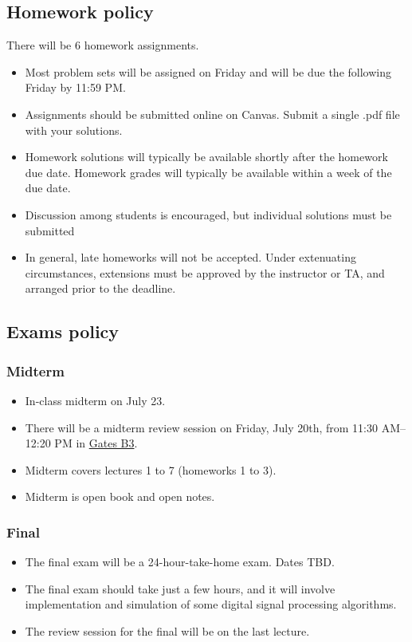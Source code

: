 \documentclass[10pt]{article}
\begin{document}
\subsection*{Homework policy}

There will be 6 homework assignments.
\begin{itemize}
	\item Most problem sets will be assigned on Friday and will be due the following Friday by 11:59 PM.
	\item Assignments should be submitted online on Canvas. Submit a single .pdf file with your solutions. 
	\item Homework solutions will typically be available shortly after the homework due date. Homework grades will typically be available within a week of the due date.
	\item Discussion among students is encouraged, but individual solutions must be submitted
	\item In general, late homeworks will not be accepted. Under extenuating circumstances, extensions must be approved by the instructor or TA, and arranged prior to the deadline.
\end{itemize}

\subsection*{Exams policy}
\subsubsection*{Midterm}
\begin{itemize}
	\item In-class midterm on July 23. 
	\item There will be a midterm review session on Friday, July 20th, from 11:30 AM-- 12:20 PM in \href{https://campus-map.stanford.edu/?srch=Gates+Computer+Science}{Gates B3}.
	\item Midterm covers lectures 1 to 7 (homeworks 1 to 3).
	\item Midterm is open book and open notes.
\end{itemize}

\subsubsection*{Final}
\begin{itemize}
	\item The final exam will be a 24-hour-take-home exam. Dates TBD.
	\item The final exam should take just a few hours, and it will involve implementation and simulation of some digital signal processing algorithms.
	\item The review session for the final will be on the last lecture.
\end{itemize}
\end{document}
